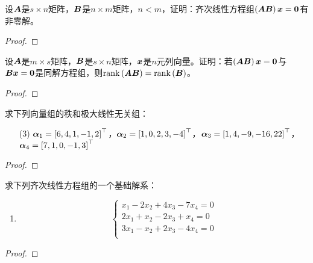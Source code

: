 \setcounter{problem}{20}
\begin{problem}
设\(\boldsymbol{A}\)是\(s\times n\)矩阵，\(\boldsymbol{B}\)是\(n\times m\)矩阵，\(n<m\)，证明：齐次线性方程组\(\left( \boldsymbol{A}\boldsymbol{B} \right)\boldsymbol{x}=\boldsymbol{0}\)有非零解。
\end{problem}
\begin{proof}

\end{proof}

\begin{problem}
设\(\boldsymbol{A}\)是\(m\times s\)矩阵，\(\boldsymbol{B}\)是\(s\times n\)矩阵，\(\boldsymbol{x}\)是\(n\)元列向量。证明：若\(\left( \boldsymbol{A}\boldsymbol{B} \right)\boldsymbol{x}=\boldsymbol{0}\)与\(\boldsymbol{B}\boldsymbol{x}=\boldsymbol{0}\)是同解方程组，则\(\mathrm{rank}\left( \boldsymbol{A}\boldsymbol{B} \right)=\mathrm{rank}\left( \boldsymbol{B} \right)\)。
\end{problem}
\begin{proof}

\end{proof}

\setcounter{problem}{25}
\begin{problem}
求下列向量组的秩和极大线性无关组：
\begin{enumerate}
    \item[(3)] \(\boldsymbol{\alpha}_1=\left[ 6,4,1,-1,2 \right]^\top\)，\(\boldsymbol{\alpha}_2=\left[ 1,0,2,3,-4 \right]^\top\)，\(\boldsymbol{\alpha}_3=\left[ 1,4,-9,-16,22 \right]^\top\)，\(\boldsymbol{\alpha}_4=\left[ 7,1,0,-1,3 \right]^\top\)
\end{enumerate}
\end{problem}
\begin{proof}

\end{proof}

\setcounter{problem}{27}
\begin{problem}
求下列齐次线性方程组的一个基础解系：
\begin{enumerate}
    \item
          {
          \begin{equation*}
              \begin{cases}
                  x_1-2x_2+4x_3-7x_4=0 \\
                  2x_1+x_2-2x_3+x_4=0  \\
                  3x_1-x_2+2x_3-4x_4=0 \\
              \end{cases}
          \end{equation*}
          }
\end{enumerate}
\end{problem}
\begin{proof}

\end{proof}

